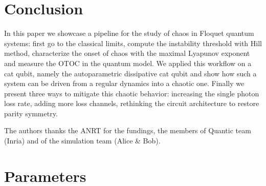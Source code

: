 \documentclass[aps,prx,reprint,floatfix,amsmath,amssymb,longbibliography]{revtex4-2}
\begin{document}
\section{Conclusion}
In this paper we showcase a pipeline for the study of chaos in Floquet quantum systems: first go to the classical limits, compute the instability threshold with Hill method, characterize the onset of chaos with the maximal Lyapunov exponent and measure the OTOC in the quantum model. We applied this workflow on a cat qubit, namely the autoparametric dissipative cat qubit and show how such a system can be driven from a regular dynamics into a chaotic one. Finally we present three ways to mitigate this chaotic behavior: increasing the single photon loss rate, adding more loss channels, rethinking the circuit architecture to restore parity symmetry.

\begin{acknowledgments}
The authors thanks the ANRT for the fundings, the members of Quantic team (Inria) and of the simulation team (Alice \& Bob).

\end{acknowledgments}

\appendix
\section{Parameters}
\label{app:parameters}
\end{document}
